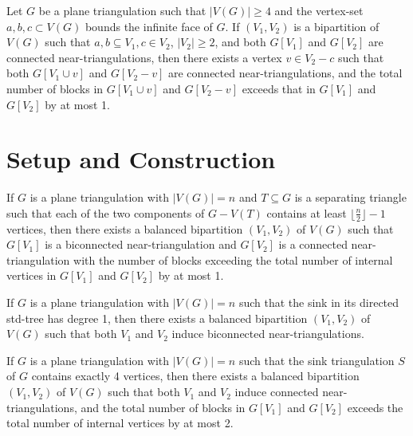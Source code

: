 \begin{lemma}
\label{lem:3con2}
Let $G$ be a plane triangulation such that $|V(G)| \geq 4$ and the vertex-set ${a, b, c} \subset V(G)$ bounds the infinite face of $G$. If $(V_1, V_2)$ is a bipartition of $V(G)$ such that ${a, b} \subseteq V_1, c \in V_2$, $|V_2| \geq 2$, and both $G[V_1]$ and $G[V_2]$ are connected near-triangulations, then there exists a vertex $v \in V_2-c$ such that both $G[V_1 \cup v]$ and $G[V_2-v]$ are connected near-triangulations, and the total number of blocks in $G[V_1 \cup v]$ and $G[V_2-v]$ exceeds that in $G[V_1]$ and $G[V_2]$ by at most 1.
\end{lemma}

\section{Setup and Construction}

\begin{proposition}
\label{prop:warmup}
If $G$ is a plane triangulation with $|V(G)|=n$ and $T \subseteq G$ is a separating triangle such that each of the two components of $G-V(T)$ contains at least $\lfloor \frac{n}{2} \rfloor-1$ vertices, then there exists a balanced bipartition $(V_1, V_2)$ of $V(G)$ such that $G[V_1]$ is a biconnected near-triangulation and $G[V_2]$ is a connected near-triangulation with the number of blocks exceeding the total number of internal vertices in $G[V_1]$ and $G[V_2]$ by at most 1.
\end{proposition}

\begin{proposition}
\label{prop:onedegsink}
If $G$ is a plane triangulation with $|V(G)|=n$ such that the sink in its directed std-tree has degree 1, then there exists a balanced bipartition $(V_1, V_2)$ of $V(G)$ such that both $V_1$ and $V_2$ induce biconnected near-triangulations.
\end{proposition}

\begin{proposition}
\label{prop:sonly4}
If $G$ is a plane triangulation with $|V(G)|=n$ such that the sink triangulation $S$ of $G$ contains exactly 4 vertices, then there exists a balanced bipartition $(V_1, V_2)$ of $V(G)$ such that both $V_1$ and $V_2$ induce connected near-triangulations, and the total number of blocks in $G[V_1]$ and $G[V_2]$ exceeds the total number of internal vertices by at most 2.
\end{proposition}

